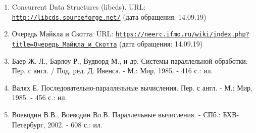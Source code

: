 {\begin{enumerate}
		\item Concurrent Data Structures (libcds). URL: \href{http://libcds.sourceforge.net/}{\nolinkurl{http://libcds.sourceforge.net/}} (дата обращения: 14.09.19)
		\item Очередь Майкла и Скотта. URL: \href{https://neerc.ifmo.ru/wiki/index.php?title=%D0%9E%D1%87%D0%B5%D1%80%D0%B5%D0%B4%D1%8C_%D0%9C%D0%B0%D0%B9%D0%BA%D0%BB%D0%B0_%D0%B8_%D0%A1%D0%BA%D0%BE%D1%82%D1%82%D0%B0}{\nolinkurl{https://neerc.ifmo.ru/wiki/index.php?title=Очередь_Майкла_и_Скотта}} (дата обращения: 14.09.19)
		\item Баер Ж.-Л., Барлоу Р., Вудворд М., и др. Системы параллельной обработки: Пер. с англ. / Под. ред. Д. Ивенса. - М.: Мир, 1985. - 416 с.: ил.
		\item Валях Е. Последовательно-параллельные вычисления. Пер. с англ. - М.: Мир, 1985. - 456 с.: ил.
		\item Воеводин В.В., Воеводин Вл.В. Параллельные вычисления. - СПб.: БХВ-Петербург, 2002. - 608 с.: ил.
	\end{enumerate}
}

